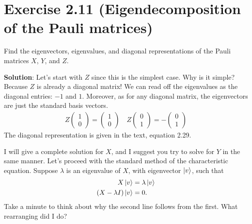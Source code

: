 \documentclass{book}
\begin{document}
\section*{Exercise 2.11 (Eigendecomposition of the Pauli matrices)}
    Find the eigenvectors, eigenvalues, and diagonal representations of the Pauli matrices $X$, $Y$, and $Z$.
    
    \textbf{Solution}: Let's start with $Z$ since this is the simplest case. Why is it simple? Because $Z$ is already a diagonal matrix! We can read off the eigenvalues as the diagonal entries: $-1$ and $1$. Moreover, as for any diagonal matrix, the eigenvectors are just the standard basis vectors.
    \begin{align}
        Z \begin{pmatrix}
            1 \\
            0
        \end{pmatrix}
        = \begin{pmatrix}
            1 \\
            0
        \end{pmatrix}
        \quad Z
        \begin{pmatrix}
            0 \\
            1
        \end{pmatrix}
        = -\begin{pmatrix}
            0 \\
            1
        \end{pmatrix}
    \end{align}
    The diagonal representation is given in the text, equation 2.29.
    
    I will give a complete solution for $X$, and I suggest you try to solve for $Y$ in the same manner. Let's proceed with the standard method of the characteristic equation. Suppose $\lambda$ is an eigenvalue of $X$, with eigenvector $\ket{v}$, such that
    \begin{align} \label{eq:char_matrix}
    \begin{aligned}
        X \ket{v} &= \lambda \ket{v} \\
        (X - \lambda I) \ket{v} &= 0.
    \end{aligned}
    \end{align}
    Take a minute to think about why the second line follows from the first. What rearranging did I do?
    
\end{document}
